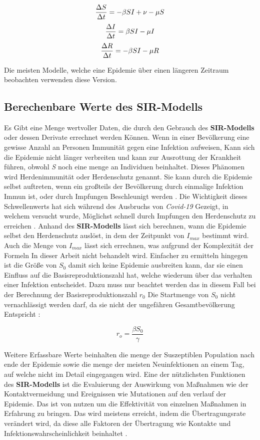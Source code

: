 \documentclass[12pt]{scrartcl} %
\begin{document}
$$ \frac{\Delta S}{\Delta t} = -\beta\space S I + \nu - \mu S $$
$$ \frac{\Delta I}{\Delta t} = \beta\space S I - \mu I $$
$$ \frac{\Delta R}{\Delta t} = -\beta\space S I - \mu R $$

Die meisten Modelle, welche eine Epidemie über einen längeren Zeitraum beobachten verwenden diese Version.


\subsection{Berechenbare Werte des SIR-Modells}

Es Gibt eine Menge wertvoller Daten, die durch den Gebrauch des \textbf{SIR-Modells} oder dessen Derivate errechnet werden Können.
Wenn in einer Bevölkerung eine gewisse Anzahl an Personen Immunität gegen eine Infektion aufweisen, Kann sich die Epidemie nicht länger verbreiten und kann zur Ausrottung der Krankheit führen, obwohl \textsl{S} noch eine menge an Individuen beinhaltet. Dieses Phänomen wird Herdenimmunität oder Herdenschutz genannt. Sie kann durch die Epidemie selbst auftreten, wenn ein großteils der Bevölkerung durch einmalige Infektion Immun ist, oder durch Impfungen Beschleunigt werden \cite{3}. Die Wichtigkeit dieses Schwellenwerts hat sich während des Ausbruchs von \textsl{Covid-19} Gezeigt, in welchem versucht wurde, Möglichst schnell durch Impfungen den Herdenschutz zu erreichen \cite{10}. Anhand des \textbf{SIR-Modells} lässt sich berechnen, wann die Epidemie selbst den Herdenschutz auslöst, in dem der Zeitpunkt von $ \textit{I}_{max} $ bestimmt wird. Auch die Menge von $ \textit{I}_{max} $ lässt sich errechnen, was aufgrund der Komplexität der Formeln In dieser Arbeit nicht behandelt wird. Einfacher zu ermitteln hingegen ist die Größe von $ \textit{S}_{0} $ damit sich keine Epidemie ausbreiten kann, dar sie einen Einfluss auf die Basisreproduktionszahl hat, welche wiederum über das verhalten einer Infektion entscheidet. 
Dazu muss nur beachtet werden das in diesem Fall bei der Berechnung der Basisreproduktionszahl $\textit{r}_{0} $ Die Startmenge von $ \textit{S}_{0}$ nicht vernachlässigt werden darf, da sie nicht der ungefähren Gesamtbevölkerung Entspricht \cite{7, 10}:

$$ r_{o} = \frac{\beta S_{0}}{\gamma} $$

Weitere Erfassbare Werte beinhalten die menge der Suszeptiblen Population nach ende der Epidemie sowie die menge der meisten Neuinfektionen an einem Tag, auf welche nicht im Detail eingegangen wird. Eine der nützlichsten Funktionen des \textbf{SIR-Modells} ist die Evaluierung der Auswirkung von Maßnahmen wie der Kontaktvermeidung und Ereignissen wie Mutationen auf den verlauf der Epidemie. Das ist von nutzen um die Effektivität von einzelnen Maßnahmen in Erfahrung zu bringen. Das wird meistens erreicht, indem die Übertragungsrate \textbeta\space verändert wird, da diese alle Faktoren der Übertragung wie Kontakte und Infektionswahrscheinlichkeit beinhaltet \cite{8, 6, 9}.
\end{document}
